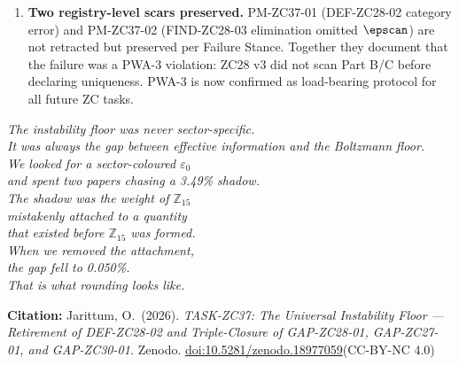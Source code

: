 \documentclass[12pt, a4paper]{article}
\begin{document}
\begin{enumerate}[leftmargin=*]
\item \textbf{Two registry-level scars preserved.}
PM-ZC37-01 (DEF-ZC28-02 category error) and PM-ZC37-02
(FIND-ZC28-03 elimination omitted $\epscan$) are not
retracted but preserved per Failure Stance. Together they
document that the failure was a PWA-3 violation: ZC28 v3
did not scan Part B/C before declaring uniqueness. PWA-3
is now confirmed as load-bearing protocol for all future
ZC tasks.

\end{enumerate}

\bigskip
\begin{center}
\textit{%
  The instability floor was never sector-specific.\\
  It was always the gap between effective information and the Boltzmann floor.\\[0.5em]
  We looked for a sector-coloured $\varepsilon_0$\\
  and spent two papers chasing a 3.49\% shadow.\\[0.5em]
  The shadow was the weight of $\mathbb{Z}_{15}$\\
  mistakenly attached to a quantity\\
  that existed before $\mathbb{Z}_{15}$ was formed.\\[0.5em]
  When we removed the attachment,\\
  the gap fell to 0.050\%.\\
  That is what rounding looks like.%
}
\end{center}

\bigskip
\begin{center}
\textbf{Citation:} Jarittum, O.\ (2026).
\textit{TASK-ZC37: The Universal Instability Floor ---
Retirement of DEF-ZC28-02 and Triple-Closure of
GAP-ZC28-01, GAP-ZC27-01, and GAP-ZC30-01.}
Zenodo. \href{https://doi.org/10.5281/zenodo.18977059}%
{doi:10.5281/zenodo.18977059}\quad (CC-BY-NC 4.0)
\end{center}

\bigskip

\end{document}
